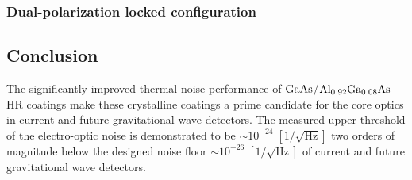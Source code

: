 \subsubsection{Dual-polarization locked configuration}


\subsection{Conclusion}
The significantly improved thermal noise performance of $\mathrm{GaAs}$/$\mathrm{Al_{0.92}Ga_{0.08}As}$ HR coatings make these crystalline coatings a prime candidate for the core optics in current and future gravitational wave detectors. The measured upper threshold of the electro-optic noise is demonstrated to be $\sim 10^{-24} \; [1/\sqrt{\mathrm{Hz}}]$ two orders of magnitude below the designed noise floor $\sim 10^{-26}\; [1/\sqrt{\mathrm{Hz}}]$ of current and future gravitational wave detectors.
